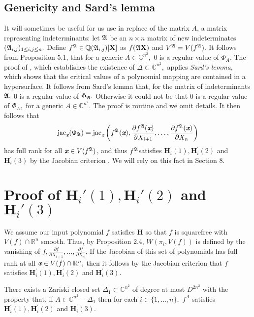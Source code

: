 \documentclass[sigconf]{acmart}
\def\xb{\textit{\textbf{x}}}
\def\C{\mathbb{C}}
\def\jac{ \textrm{jac}}
\def\pa{\partial}
\def\A{\frak{A}}
\begin{document}
\subsection{Genericity and Sard's lemma}
%
It will sometimes be useful for us use in replace of the matrix $A$, a matrix representing indeterminants: let $\A$ be an $n \times n$ matrix of new indeterminates $(\A_{i,j})_{1 \leq i , j \leq n}.$ Define $f^{\A} \in \mathbb{Q}(\A_{i,j})[\textbf{X}]$ as $f(\A\textbf{X})$ and $V^\A=V(f^\A).$ It follows from Proposition 5.1, that for a generic $A \in \C^{n^2},$ $0$ is a regular value of $\Phi_{A}$.  The proof of \cite[Theorem B.3]{TWT}, which establishes the existence of $\Delta \subset \C^{n^2},$ applies \textit{Sard's lemma}, which shows that the critical values of a polynomial mapping are contained in a hypersurface. It follows from Sard's lemma that, for the matrix of indeterminants $\A,$ $0$ is a regular value of $\Phi_{\A}.$ Otherwise it could not be that $0$ is a regular value of $\Phi_A,$ for a generic $A\in \C^{n^2}.$ The proof is routine and we omit details. It then follows that 
\[
\jac_{\xb}(\Phi_{\A}) = \jac_{\xb}\left(f^{\A}(\xb),\frac{\pa f^{\A}(\xb)}{\pa X_{i+1}},\hdots,\frac{\pa f^{\A}(\xb)}{\pa X_n}\right)
\]
has full rank for all $\xb \in V(f^{\A})$, and thus $f^{\A}$satisfies $\textbf{H}_i^{'}(1),\textbf{H}_i^{'}(2)$ and $\textbf{H}_i^{'}(3)$ by the Jacobian criterion \cite[Theorem 16.19]{ECA}. We will rely on this fact in Section 8.
%
\section{Proof of $\textbf{H}_i'(1),\textbf{H}_i'(2)$ and $\textbf{H}_i'(3)$}
%
We assume our input polynomial $f$ satisfies \textbf{H} so that $f$ is squarefree with $V(f) \cap \mathbb{R}^n$ smooth. Thus, by Proposition 2.4,  $W(\pi_i,V(f))$ is defined by the vanishing of $f,\frac{\pa f}{\pa X_{i+1}},\hdots,\frac{\pa f}{\pa X_n}.$ If the Jacobian of this set of polynomials has full rank at all $\xb \in V(f) \cap \mathbb{R}^n,$ then it follows by the Jacobian criterion \cite[Theorem 16.19]{ECA} that $f$ satisfies $\textbf{H}_i^{'}(1),\textbf{H}_i^{'}(2)$ and $\textbf{H}_i^{'}(3)$. 
%
\begin{theorem}
There exists a Zariski closed set $\Delta_1 \subset \C^{n^2}$ of degree at most $D^{2n^2}$ with the property that, if $A \in \C^{n^2} - \Delta_1$ then for each $i \in \{1,\hdots,n\},$ $f^A$ satisfies $\textbf{H}_i^{'}(1),\textbf{H}_i^{'}(2)$ and $\textbf{H}_i^{'}(3)$.
\end{theorem}
%
\end{document}
